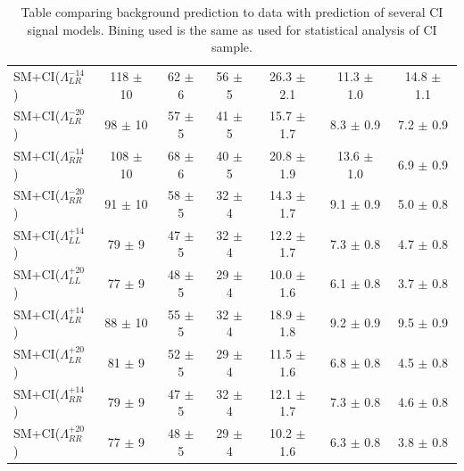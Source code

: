 \begin {table}[h]
\begin{center}
\begin{tabular}{  l | c c c | c c c  }
			SM+CI($\Lambda^{-14}_{LR}$) & 118 $\pm$ 10 & 62 $\pm$ 6 & 56 $\pm$ 5 & 26.3 $\pm$ 2.1 & 11.3 $\pm$ 1.0 & 14.8 $\pm$ 1.1 \\
			SM+CI($\Lambda^{-20}_{LR}$) & 98 $\pm$ 10 & 57 $\pm$ 5 & 41 $\pm$ 5 & 15.7 $\pm$ 1.7 & 8.3 $\pm$ 0.9 & 7.2 $\pm$ 0.9 \\
			SM+CI($\Lambda^{-14}_{RR}$) & 108 $\pm$ 10 & 68 $\pm$ 6 & 40 $\pm$ 5 & 20.8 $\pm$ 1.9 & 13.6 $\pm$ 1.0 & 6.9 $\pm$ 0.9 \\
			SM+CI($\Lambda^{-20}_{RR}$) & 91 $\pm$ 10 & 58 $\pm$ 5 & 32 $\pm$ 4 & 14.3 $\pm$ 1.7 & 9.1 $\pm$ 0.9 & 5.0 $\pm$ 0.8 \\
			\hline
			SM+CI($\Lambda^{+14}_{LL}$) & 79 $\pm$ 9 & 47 $\pm$ 5 & 32 $\pm$ 4 & 12.2 $\pm$ 1.7 & 7.3 $\pm$ 0.8 & 4.7 $\pm$ 0.8 \\
			SM+CI($\Lambda^{+20}_{LL}$) & 77 $\pm$ 9 & 48 $\pm$ 5 & 29 $\pm$ 4 & 10.0 $\pm$ 1.6 & 6.1 $\pm$ 0.8 & 3.7 $\pm$ 0.8 \\
			SM+CI($\Lambda^{+14}_{LR}$) & 88 $\pm$ 10 & 55 $\pm$ 5 & 32 $\pm$ 4 & 18.9 $\pm$ 1.8 & 9.2 $\pm$ 0.9 & 9.5 $\pm$ 0.9 \\
			SM+CI($\Lambda^{+20}_{LR}$) & 81 $\pm$ 9 & 52 $\pm$ 5 & 29 $\pm$ 4 & 11.5 $\pm$ 1.6 & 6.8 $\pm$ 0.8 & 4.5 $\pm$ 0.8 \\
			SM+CI($\Lambda^{+14}_{RR}$) & 79 $\pm$ 9 & 47 $\pm$ 5 & 32 $\pm$ 4 & 12.1 $\pm$ 1.7 & 7.3 $\pm$ 0.8 & 4.6 $\pm$ 0.8 \\
			SM+CI($\Lambda^{+20}_{RR}$) & 77 $\pm$ 9 & 48 $\pm$ 5 & 29 $\pm$ 4 & 10.2 $\pm$ 1.6 & 6.3 $\pm$ 0.8 & 3.8 $\pm$ 0.8 \\
			\hline
		\end{tabular}
		\label{tab:CI_results2}
	  	\caption{Table comparing background prediction to data with prediction of several CI signal models. Bining used is the same as used for statistical analysis of CI sample.}
	  	\end{center}
	\end {table}



